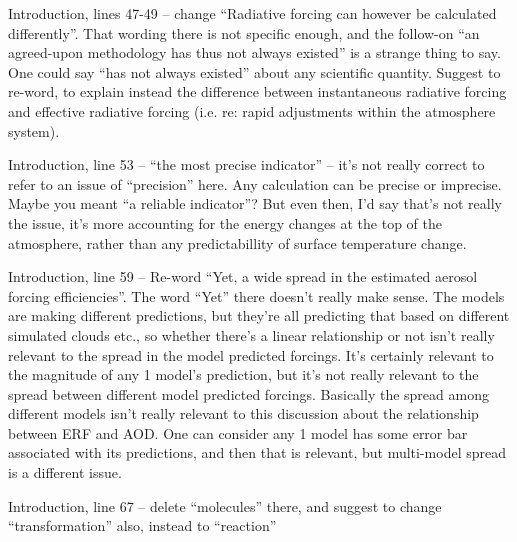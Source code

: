 \documentclass{reviewresponse}
\begin{document}
  \begin{revresponse}[Fixed.]
  \end{revresponse}
  \begin{revcomment}[after title={: O5},colframe={colorcommentresolved}]
    Introduction, lines 47-49 -- change ``Radiative forcing can however be calculated
    differently''. That wording there is not specific enough, and the follow-on ``an
    agreed-upon methodology has thus not always existed'' is a strange thing to say. One
    could say ``has not always existed'' about any scientific quantity. Suggest to
    re-word, to explain instead the difference between instantaneous radiative forcing
    and effective radiative forcing (i.e. re: rapid adjustments within the atmosphere
    system).
  \end{revcomment}
  \begin{revcomment}[after title={: O6},colframe={colorcommentresolved}]
    Introduction, line 53 -- ``the most precise indicator'' -- it's not really correct
    to refer to an issue of ``precision'' here. Any calculation can be precise or
    imprecise. Maybe you meant ``a reliable indicator''? But even then, I'd say that's
    not really the issue, it's more accounting for the energy changes at the top of the
    atmosphere, rather than any predictabillity of surface temperature change.
  \end{revcomment}
  \begin{revcomment}[after title={: O7},colframe={colorcommentresolved}]
    Introduction, line 59 -- Re-word ``Yet, a wide spread in the estimated aerosol
    forcing efficiencies''. The word ``Yet'' there doesn't really make sense. The models
    are making different predictions, but they're all predicting that based on different
    simulated clouds etc., so whether there's a linear relationship or not isn't really
    relevant to the spread in the model predicted forcings. It's certainly relevant to
    the magnitude of any 1 model's prediction, but it's not really relevant to the
    spread between different model predicted forcings. Basically the spread among
    different models isn't really relevant to this discussion about the relationship
    between ERF and AOD. One can consider any 1 model has some error bar associated with
    its predictions, and then that is relevant, but multi-model spread is a different
    issue.
  \end{revcomment}
  \begin{revcomment}[after title={: O8}]
    Introduction, line 67 -- delete ``molecules'' there, and suggest to change
    ``transformation'' also, instead to ``reaction''
  \end{revcomment}
\end{document}
